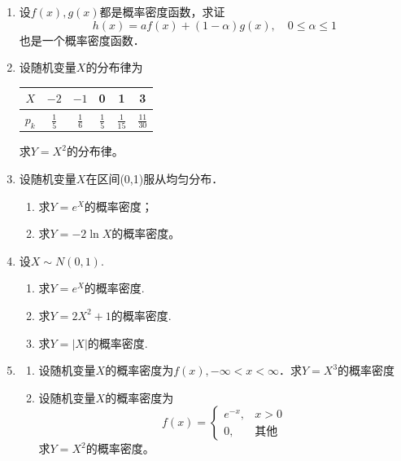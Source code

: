 \begin{enumerate}
    \item 设$f(x),g(x)$都是概率密度函数，求证
    $$h(x)=af(x)+(1-\alpha)g(x),\quad 0\leq \alpha \leq 1$$
    也是一个概率密度函数．


    \item 设随机变量$X$的分布律为   
    \renewcommand{\arraystretch}{1.5}
    \begin{table}[H]\centering
        \begin{tabular}{c|ccccc}
        
            $X$   & $-2$            & $-1$            & 0             & 1              & 3               \\ \hline
        $p_k$ & $\displaystyle{\frac{1}{5}}$ & $\displaystyle{\frac{1}{6}}$ & $\displaystyle{\frac{1}{5}}$ & $\displaystyle{\frac{1}{15}}$ & $\displaystyle{\frac{11}{30}}$ 
        \end{tabular}
    \end{table}
 

    求$Y=X^2$的分布律。


    \item 设随机变量$X$在区间(0,1)服从均匀分布．
    \begin{enumerate}
        \item 求$Y=e^X$的概率密度；
        \item 求$Y=-2\ln X$的概率密度。
    \end{enumerate}


    \item 设$X\sim N(0,1)$.
    \begin{enumerate}
        \item 求$Y=e^X$的概率密度.
        \item 求$Y=2X^2+1$的概率密度.
        \item 求$Y=|X|$的概率密度.
    \end{enumerate}

    
    \item \begin{enumerate}
        \item 设随机变量$X$的概率密度为$f(x),-\infty < x<\infty$．求$Y=X^3$的概率密度
        \item 设随机变量$X$的概率密度为
        $$f(x)=\left\{\begin{array}{ll}
            e^{-x}, & x>0\\
            0, & \mbox{其他}
        \end{array}\right.$$
        求$Y=X^2$的概率密度。
    \end{enumerate}



\end{enumerate}
